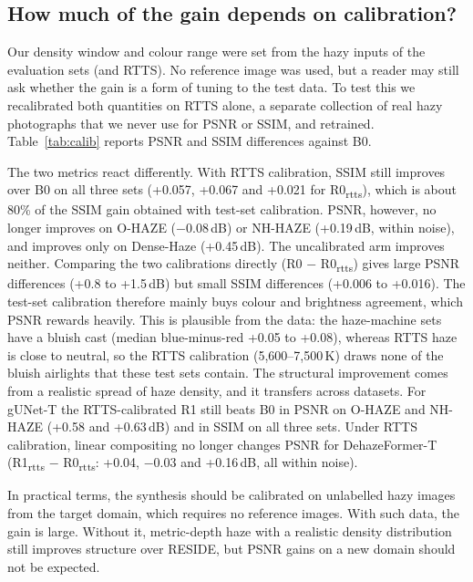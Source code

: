 \documentclass{article}
\begin{document}
\subsection{How much of the gain depends on calibration?}
\label{sec:calib}
Our density window and colour range were set from the hazy inputs of the evaluation sets (and RTTS). No reference image was used, but a reader may still ask whether the gain is a form of tuning to the test data. To test this we recalibrated both quantities on RTTS alone, a separate collection of real hazy photographs that we never use for PSNR or SSIM, and retrained. Table~\ref{tab:calib} reports PSNR and SSIM differences against B0.

The two metrics react differently. With RTTS calibration, SSIM still improves over B0 on all three sets (+0.057, +0.067 and +0.021 for R0\textsubscript{rtts}), which is about 80\% of the SSIM gain obtained with test-set calibration. PSNR, however, no longer improves on O-HAZE ($-0.08$\,dB) or NH-HAZE (+0.19\,dB, within noise), and improves only on Dense-Haze (+0.45\,dB). The uncalibrated arm improves neither. Comparing the two calibrations directly (R0 $-$ R0\textsubscript{rtts}) gives large PSNR differences (+0.8 to +1.5\,dB) but small SSIM differences (+0.006 to +0.016). The test-set calibration therefore mainly buys colour and brightness agreement, which PSNR rewards heavily. This is plausible from the data: the haze-machine sets have a bluish cast (median blue-minus-red +0.05 to +0.08), whereas RTTS haze is close to neutral, so the RTTS calibration (5{,}600--7{,}500\,K) draws none of the bluish airlights that these test sets contain. The structural improvement comes from a realistic spread of haze density, and it transfers across datasets. For gUNet-T the RTTS-calibrated R1 still beats B0 in PSNR on O-HAZE and NH-HAZE (+0.58 and +0.63\,dB) and in SSIM on all three sets. Under RTTS calibration, linear compositing no longer changes PSNR for DehazeFormer-T (R1\textsubscript{rtts} $-$ R0\textsubscript{rtts}: +0.04, $-0.03$ and +0.16\,dB, all within noise).

In practical terms, the synthesis should be calibrated on unlabelled hazy images from the target domain, which requires no reference images. With such data, the gain is large. Without it, metric-depth haze with a realistic density distribution still improves structure over RESIDE, but PSNR gains on a new domain should not be expected.

\begin{table}[t]
\caption{Calibration controls: difference to B0 (or between calibrations) in PSNR and SSIM. Bold: 95\% bootstrap interval excludes zero (and $|\Delta|\ge0.3$\,dB for PSNR). DehazeFormer-T R0 and B0 use three seeds, all other arms one.}
\label{tab:calib}
\centering
\small
\resizebox{\linewidth}{!}{}
\end{table}
\end{document}

